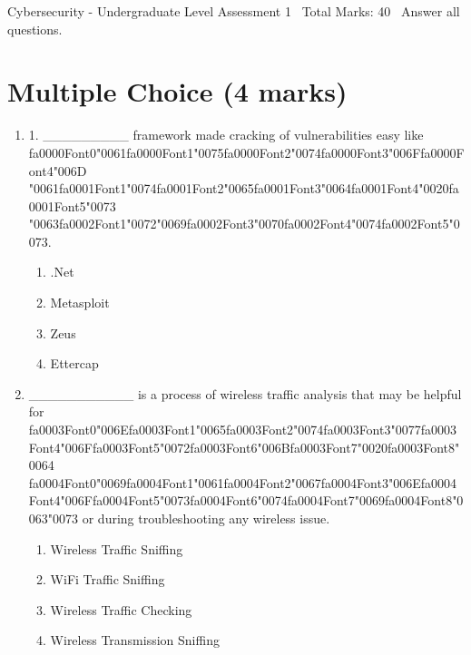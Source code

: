 \documentclass[12pt]{article}
\begin{document}
\begin{center}
Cybersecurity - Undergraduate Level Assessment 1 \
Total Marks: 40 \
Answer all questions.
\end{center}

\section*{Multiple Choice (4 marks)}
\begin{enumerate}[label=\arabic*.]
\item 1. \_\_\_\_\_\_\_\_\_ framework made cracking of vulnerabilities easy like {\csname fa0000Font0\endcsname\char"0061}{\csname fa0000Font1\endcsname\char"0075}{\csname fa0000Font2\endcsname\char"0074}{\csname fa0000Font3\endcsname\char"006F}{\csname fa0000Font4\endcsname\char"006D} {\char"0061}{\csname fa0001Font1\endcsname\char"0074}{\csname fa0001Font2\endcsname\char"0065}{\csname fa0001Font3\endcsname\char"0064}{\csname fa0001Font4\endcsname\char"0020}{\csname fa0001Font5\endcsname\char"0073} {\char"0063}{\csname fa0002Font1\endcsname\char"0072}{\char"0069}{\csname fa0002Font3\endcsname\char"0070}{\csname fa0002Font4\endcsname\char"0074}{\csname fa0002Font5\endcsname\char"0073}.
\begin{enumerate}[label=(\alph*)]
    \item .Net
    \item Metasploit
    \item Zeus
    \item Ettercap
\end{enumerate}
\item \_\_\_\_\_\_\_\_\_\_\_ is a process of wireless traffic analysis that may be helpful for {\csname fa0003Font0\endcsname\char"006E}{\csname fa0003Font1\endcsname\char"0065}{\csname fa0003Font2\endcsname\char"0074}{\csname fa0003Font3\endcsname\char"0077}{\csname fa0003Font4\endcsname\char"006F}{\csname fa0003Font5\endcsname\char"0072}{\csname fa0003Font6\endcsname\char"006B}{\csname fa0003Font7\endcsname\char"0020}{\csname fa0003Font8\endcsname\char"0064} {\csname fa0004Font0\endcsname\char"0069}{\csname fa0004Font1\endcsname\char"0061}{\csname fa0004Font2\endcsname\char"0067}{\csname fa0004Font3\endcsname\char"006E}{\csname fa0004Font4\endcsname\char"006F}{\csname fa0004Font5\endcsname\char"0073}{\csname fa0004Font6\endcsname\char"0074}{\csname fa0004Font7\endcsname\char"0069}{\csname fa0004Font8\endcsname\char"0063}{\char"0073} or during troubleshooting any wireless issue.
\begin{enumerate}[label=(\alph*)]
    \item Wireless Traffic Sniffing
    \item WiFi Traffic Sniffing
    \item Wireless Traffic Checking
    \item Wireless Transmission Sniffing
\end{enumerate}
\end{enumerate}
\end{document}
